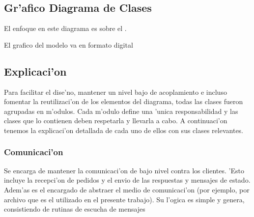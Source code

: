 \subsection{Gr'afico Diagrama de Clases}

El enfoque en este diagrama es sobre el .

El grafico del modelo va en formato digital

% 

% 

\clearpage

\subsection{Explicaci'on}
Para facilitar el dise'no, mantener un nivel bajo de acoplamiento e incluso fomentar la reutilizaci'on de los elementos del diagrama, todas las clases fueron agrupadas en m'odulos. Cada m'odulo define una 'unica responsabilidad y las clases que lo contienen deben respetarla y llevarla a cabo. A continuaci'on tenemos la explicaci'on detallada de cada uno de ellos con sus clases relevantes.


\subsubsection{Comunicaci'on}
Se encarga de mantener la comunicaci'on de bajo nivel contra los clientes. 'Esto incluye la recepci'on de pedidos y el envio de las respuestas y mensajes de estado. Adem'as es el encargado de abstraer el medio de comunicaci'on (por ejemplo, por archivo que es el utilizado en el presente trabajo). Su l'ogica es simple y genera, consistiendo de rutinas de escucha de mensajes


